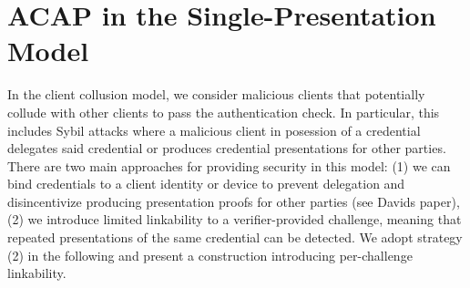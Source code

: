 \section{ACAP in the Single-Presentation Model} \label{sec:constr:sybil}

In the client collusion model, we consider malicious clients that potentially collude with other clients to pass the authentication check. In particular, this includes Sybil attacks where a malicious client in posession of a credential delegates said credential or produces credential presentations for other parties. There are two main approaches for providing security in this model: (1) we can bind credentials to a client identity or device to prevent delegation and disincentivize producing presentation proofs for other parties (see Davids paper), (2) we introduce limited linkability to a verifier-provided challenge, meaning that repeated presentations of the same credential can be detected. We adopt strategy (2) in the following and present a construction introducing per-challenge linkability.